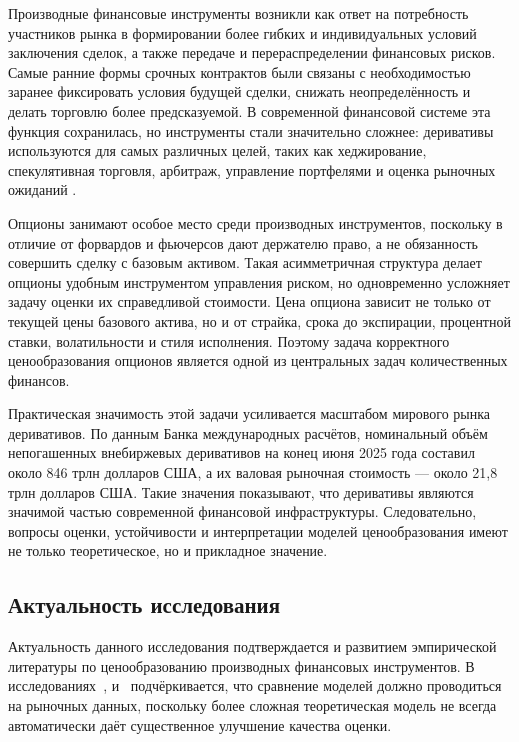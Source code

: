\documentclass[11pt,a4paper]{article}
\begin{document}
Производные финансовые инструменты возникли как ответ на потребность участников рынка в формировании более гибких и индивидуальных условий заключения сделок, а также передаче и перераспределении финансовых рисков. Самые ранние формы срочных контрактов были связаны с необходимостью заранее фиксировать условия будущей сделки, снижать неопределённость и делать торговлю более предсказуемой. В современной финансовой системе эта функция сохранилась, но инструменты стали значительно сложнее: деривативы используются для самых различных целей, таких как хеджирование, спекулятивная торговля, арбитраж, управление портфелями и оценка рыночных ожиданий \cite{Hull}.

Опционы занимают особое место среди производных инструментов, поскольку в отличие от форвардов и фьючерсов дают держателю право, а не обязанность совершить сделку с базовым активом. Такая асимметричная структура делает опционы удобным инструментом управления риском, но одновременно усложняет задачу оценки их справедливой стоимости. Цена опциона зависит не только от текущей цены базового актива, но и от страйка, срока до экспирации, процентной ставки, волатильности и стиля исполнения. Поэтому задача корректного ценообразования опционов является одной из центральных задач количественных финансов.

Практическая значимость этой задачи усиливается масштабом мирового рынка деривативов. По данным Банка международных расчётов, номинальный объём непогашенных внебиржевых деривативов на конец июня 2025 года составил около 846 трлн долларов США, а их валовая рыночная стоимость --- около 21{,}8 трлн долларов США. Такие значения показывают, что деривативы являются значимой частью современной финансовой инфраструктуры. Следовательно, вопросы оценки, устойчивости и интерпретации моделей ценообразования имеют не только теоретическое, но и прикладное значение.

\subsection*{Актуальность исследования}

Актуальность данного исследования подтверждается и развитием эмпирической литературы по ценообразованию производных финансовых инструментов. В исследованиях~\cite{Bakshi}, \cite{Dumas} и~\cite{Christoffersen} подчёркивается, что сравнение моделей должно проводиться на рыночных данных, поскольку более сложная теоретическая модель не всегда автоматически даёт существенное улучшение качества оценки.
\end{document}
